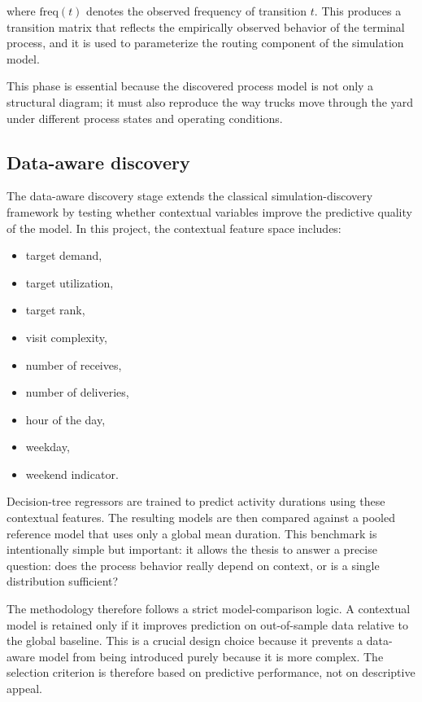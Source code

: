 where $\mathrm{freq}(t)$ denotes the observed frequency of transition $t$.
This produces a transition matrix that reflects the empirically observed behavior of the terminal process, and it is used to parameterize the routing component of the simulation model.

This phase is essential because the discovered process model is not only a structural diagram;
it must also reproduce the way trucks move through the yard under different process states and operating conditions.

\subsection{Data-aware discovery}

The data-aware discovery stage extends the classical simulation-discovery framework by testing whether contextual variables improve the predictive quality of the model.
In this project, the contextual feature space includes:
\begin{itemize}
    \item target demand,
    \item target utilization,
    \item target rank,
    \item visit complexity,
    \item number of receives,
    \item number of deliveries,
    \item hour of the day,
    \item weekday,
    \item weekend indicator.
\end{itemize}

Decision-tree regressors are trained to predict activity durations using these contextual features.
The resulting models are then compared against a pooled reference model that uses only a global mean duration.
This benchmark is intentionally simple but important:
it allows the thesis to answer a precise question:
does the process behavior really depend on context, or is a single distribution sufficient?

The methodology therefore follows a strict model-comparison logic.
A contextual model is retained only if it improves prediction on out-of-sample data relative to the global baseline.
This is a crucial design choice because it prevents a data-aware model from being introduced purely because it is more complex.
The selection criterion is therefore based on predictive performance, not on descriptive appeal.

